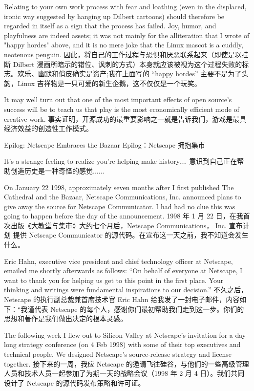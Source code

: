 \documentclass[a4paper,12pt,UTF8,twoside]{ctexbook}
\begin{document}
Relating to your own work process with fear and loathing (even in the displaced, ironic way suggested by hanging up Dilbert cartoons) should therefore be regarded in itself as a sign that the process has failed. Joy, humor, and playfulness are indeed assets; it was not mainly for the alliteration that I wrote of "happy hordes" above, and it is no mere joke that the Linux mascot is a cuddly, neotenous penguin.
因此，将自己的工作过程与恐惧和厌恶联系起来（即使是以挂断 Dilbert 漫画所暗示的错位、讽刺的方式）本身就应该被视为这个过程失败的标志。欢乐、幽默和俏皮确实是资产;我在上面写的 “happy hordes” 主要不是为了头韵，Linux 吉祥物是一只可爱的新生企鹅，这不仅仅是一个玩笑。

It may well turn out that one of the most important effects of open source's success will be to teach us that play is the most economically efficient mode of creative work.
事实证明，开源成功的最重要影响之一就是告诉我们，游戏是最具经济效益的创造性工作模式。

Epilog: Netscape Embraces the Bazaar
Epilog：Netscape 拥抱集市

It's a strange feeling to realize you're helping make history....
意识到自己正在帮助创造历史是一种奇怪的感觉......

On January 22 1998, approximately seven months after I first published The Cathedral and the Bazaar, Netscape Communications, Inc. announced plans to give away the source for Netscape Communicator. I had had no clue this was going to happen before the day of the announcement.
1998 年 1 月 22 日，在我首次出版《大教堂与集市》大约七个月后，Netscape Communications， Inc. 宣布计划 提供 Netscape Communicator 的源代码。在宣布这一天之前，我不知道会发生什么。

Eric Hahn, executive vice president and chief technology officer at Netscape, emailed me shortly afterwards as follows: ``On behalf of everyone at Netscape, I want to thank you for helping us get to this point in the first place. Your thinking and writings were fundamental inspirations to our decision.''
不久之后，Netscape 的执行副总裁兼首席技术官 Eric Hahn 给我发了一封电子邮件，内容如下：“我谨代表 Netscape 的每个人，感谢你们最初帮助我们走到这一步。你们的思想和著作是我们做出决定的根本灵感。

The following week I flew out to Silicon Valley at Netscape's invitation for a day-long strategy conference (on 4 Feb 1998) with some of their top executives and technical people. We designed Netscape's source-release strategy and license together.
接下来的一周，我应 Netscape 的邀请飞往硅谷，与他们的一些高级管理人员和技术人员一起参加了为期一天的战略会议（1998 年 2 月 4 日）。我们共同设计了 Netscape 的源代码发布策略和许可证。
\end{document}
